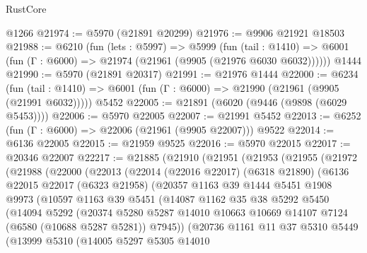 \begin{lexlean}{RustCore}
\begin{coremodule}
    @1266
@21974 := @5970 (@21891 @20299)
@21976 := @9906 @21921 @18503
@21988 := @6210
    (fun (lets : @5997) =>
    @5999
      (fun (tail : @1410) =>
      @6001 (fun (Γ : @6000) => @21974 (@21961 (@9905 (@21976 @6030 @6032))))))
    @1444
@21990 := @5970 (@21891 @20317)
@21991 := @21976 @1444
@22000 := @6234
    (fun (tail : @1410) => @6001 (fun (Γ : @6000) => @21990 (@21961 (@9905 (@21991 @6032)))))
    @5452
@22005 := @21891 (@6020 (@9446 (@9898 (@6029 @5453))))
@22006 := @5970 @22005
@22007 := @21991 @5452
@22013 := @6252 (fun (Γ : @6000) => @22006 (@21961 (@9905 @22007))) @9522
@22014 := @6136 @22005
@22015 := @21959 @9525
@22016 := @5970 @22015
@22017 := @20346 @22007
@22217 := @21885
    (@21910
      (@21951
        (@21953
          (@21955
            (@21972
              (@21988
                (@22000
                  (@22013
                    (@22014
                      (@22016 @22017)
                      (@6318 @21890)
                      (@6136
                        @22015
                        @22017
                        (@6323 @21958)
                        (@20357
                          @1163
                          @39
                          @1444
                          @5451
                          @1908
                          @9973
                          (@10597
                            @1163
                            @39
                            @5451
                            (@14087
                              @1162
                              @35
                              @38
                              @5292
                              @5450
                              (@14094
                                @5292
                                (@20374
                                  @5280
                                  @5287
                                  @14010
                                  @10663
                                  @10669
                                  @14107
                                  @7124
                                  (@6580 (@10688 @5287 @5281))
                                  @7945))
                              (@20736
                                @1161
                                @11
                                @37
                                @5310
                                @5449
                                (@13999
                                  @5310
                                  (@14005
                                    @5297
                                    @5305
                                    @14010

\end{coremodule}
\end{lexlean}
